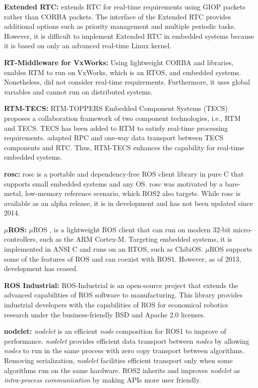 \documentclass{sig-alternate-05-2015}
\begin{document}
\textbf{Extended RTC:} 
\cite{chishiro2009extended} extends RTC for real-time requirements using GIOP packets rather than CORBA packets.
The interface of the Extended RTC provides additional options such as priority management and multiple periodic tasks. 
However, it is difficult to implement Extended RTC in embedded systems because it is based on only an advanced real-time Linux kernel.

\textbf{RT-Middleware for VxWorks:} 
Using lightweight CORBA and libraries, \cite{ikezoeopenrt} enables RTM to run on VxWorks, which is an RTOS, and embedded systems.
Nonetheless,  \cite{ikezoeopenrt} did not consider real-time requirements. 
Furthermore, it uses global variables and cannot run on distributed systems.

\textbf{RTM-TECS:} RTM-TOPPERS Embedded Component Systems (TECS) \cite{rtmtecs2016} proposes a collaboration framework of two component technologies, i.e., RTM and TECS. 
TECS \cite{azumi2015mruby} has been added to RTM to satisfy real-time processing requirements. 
\cite{rtmtecs2016} adapted RPC and one-way data transport between TECS components and RTC. 
Thus, RTM-TECS enhances the capability for real-time embedded systems.

\textbf{rosc:} 
rosc \cite{rosc@roscon2013} is a portable and dependency-free ROS client library in pure C that supports small embedded systems and any OS. rosc was motivated by a bare-metal, low-memory reference scenario, which ROS2 also targets. While rosc is available as an alpha release, it is in development and has not been updated since 2014.

\textbf{\(\mu\)ROS:} 
\(\mu\)ROS \cite{uros@roscon2013}, \cite{uros} is a lightweight ROS client that can run on modern 32-bit micro-controllers, such as the ARM Cortex-M. 
Targeting embedded systems, it is implemented in ANSI C and runs on an RTOS, such as ChibiOS. 
\(\mu\)ROS supports some of the features of ROS and can coexist with ROS1. 
However, as of 2013, development has ceased.

\textbf{ROS Industrial:} 
ROS-Industrial \cite{rosindustrial} is an open-source project that extends the advanced capabilities of ROS software to manufacturing. 
This library provides industrial developers with the capabilities of ROS for economical robotics research under the business-friendly BSD and Apache 2.0 licenses. 

\textbf{nodelet:} 
\emph{nodelet} is an efficient \emph{node} composition for ROS1 to improve of performance. 
\emph{nodelet} provides efficient data transport between \emph{nodes} by allowing \emph{nodes} to run in the same process with zero copy transport between algorithms. 
Removing serialization, \emph{nodelet} facilities efficient transport only when some algorithms run on the same hardware. 
ROS2 inherits and improves \emph{nodelet} as \emph{intra-process communication} by making APIs more user friendly. 
\end{document}
